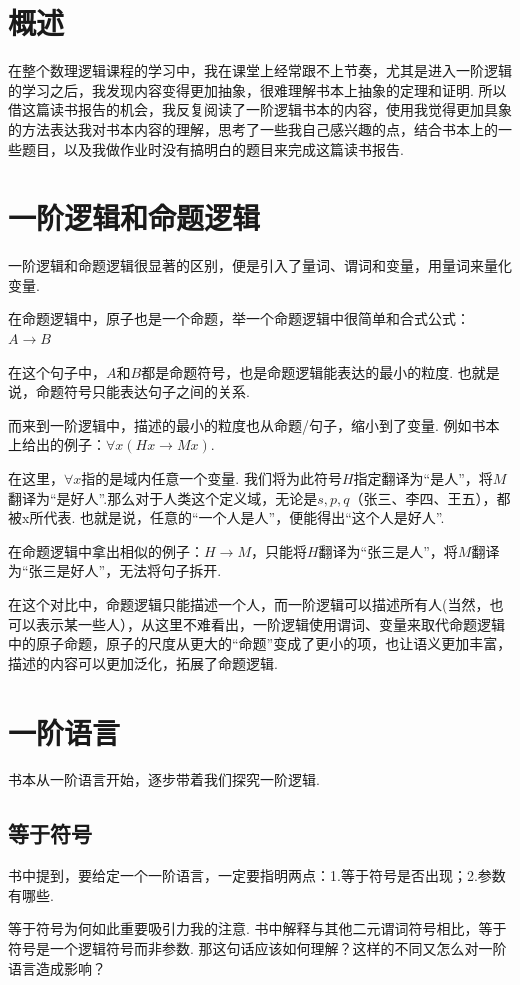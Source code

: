 \section*{概述}
在整个数理逻辑课程的学习中，我在课堂上经常跟不上节奏，尤其是进入一阶逻辑的学习之后，我发现内容变得更加抽象，很难理解书本上抽象的定理和证明. 所以借这篇读书报告的机会，我反复阅读了一阶逻辑书本的内容，使用我觉得更加具象的方法表达我对书本内容的理解，思考了一些我自己感兴趣的点，结合书本上的一些题目，以及我做作业时没有搞明白的题目来完成这篇读书报告.

\section{一阶逻辑和命题逻辑}
一阶逻辑和命题逻辑很显著的区别，便是引入了量词、谓词和变量，用量词来量化变量.

在命题逻辑中，原子也是一个命题，举一个命题逻辑中很简单和合式公式：$A \rightarrow B $

在这个句子中，$A$和$B$都是命题符号，也是命题逻辑能表达的最小的粒度. 也就是说，命题符号只能表达句子之间的关系. 

而来到一阶逻辑中，描述的最小的粒度也从命题/句子，缩小到了变量. 例如书本上给出的例子：$ {\forall x (Hx \rightarrow Mx)}.$

在这里，$ \forall x$指的是域内任意一个变量. 我们将为此符号$H$指定翻译为“是人”，将$M$翻译为“是好人”.那么对于人类这个定义域，无论是$s, p, q$（张三、李四、王五），都被x所代表. 也就是说，任意的“一个人是人”，便能得出“这个人是好人”.

在命题逻辑中拿出相似的例子：$H \rightarrow M$，只能将$H$翻译为“张三是人”，将$M$翻译为“张三是好人”，无法将句子拆开.

在这个对比中，命题逻辑只能描述一个人，而一阶逻辑可以描述所有人(当然，也可以表示某一些人），从这里不难看出，一阶逻辑使用谓词、变量来取代命题逻辑中的原子命题，原子的尺度从更大的“命题”变成了更小的项，也让语义更加丰富，描述的内容可以更加泛化，拓展了命题逻辑.

\section{一阶语言}
书本从一阶语言开始，逐步带着我们探究一阶逻辑.
\subsection{等于符号}
书中提到，要给定一个一阶语言，一定要指明两点：1.等于符号是否出现；2.参数有哪些.

等于符号为何如此重要吸引力我的注意. 书中解释与其他二元谓词符号相比，等于符号是一个逻辑符号而非参数. 那这句话应该如何理解？这样的不同又怎么对一阶语言造成影响？

